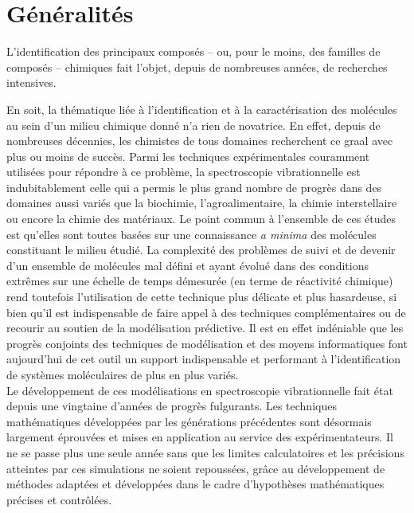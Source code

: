 \documentclass[12pt,a4paper]{book}
\begin{document}
\section{Généralités}

L'identification des principaux composés -- ou, pour le moins, des familles de composés -- chimiques fait l'objet, depuis de nombreuses années, de recherches intensives.

En soit, la thématique liée à l'identification et à la caractérisation des molécules au sein d'un milieu chimique donné n'a rien de novatrice. En effet, depuis de nombreuses décennies, les chimistes de tous domaines recherchent ce \og graal \fg{} avec plus ou moins de succès. Parmi les techniques expérimentales couramment utilisées pour répondre à ce problème, la spectroscopie vibrationnelle est indubitablement celle qui a permis le plus grand nombre de progrès dans des domaines aussi variés que la biochimie, l'agroalimentaire, la chimie interstellaire ou encore la chimie des matériaux. Le point commun à l'ensemble de ces études est qu'elles sont toutes basées sur une connaissance \textit{a minima} des molécules constituant le milieu étudié. La complexité des problèmes de suivi et de devenir d’un ensemble de molécules mal défini et ayant évolué dans des conditions extrêmes sur une échelle de temps démesurée (en terme de réactivité chimique) rend toutefois l'utilisation de cette technique plus délicate et plus hasardeuse, si bien qu'il est indispensable de faire appel à des techniques complémentaires ou de recourir au soutien de la modélisation prédictive. Il est en effet indéniable que les progrès conjoints des techniques de modélisation et des moyens informatiques font aujourd'hui de cet outil un support indispensable et performant à l'identification de systèmes moléculaires de plus en plus variés.\\

Le développement de ces modélisations en spectroscopie vibrationnelle fait état depuis une vingtaine d'années de progrès fulgurants. Les techniques mathématiques développées par les générations précédentes sont désormais largement éprouvées et mises en application au service des expérimentateurs.
Il ne se passe plus une seule année sans que les limites calculatoires et les précisions atteintes par ces simulations ne soient repoussées, grâce au développement de méthodes adaptées et développées dans le cadre d'hypothèses mathématiques précises et contrôlées. \\
\end{document}
